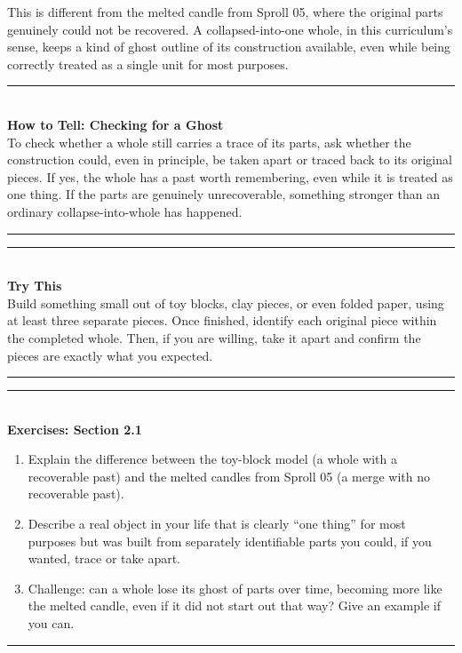 \documentclass[11pt]{book}
\newenvironment{algorithmproc}[1]{\vspace{0.6em}\noindent\rule{\linewidth}{0.6pt}\\[0.2em]\textbf{How to Tell: #1}\\[0.3em]}{\\[0.2em]\noindent\rule{\linewidth}{0.6pt}\vspace{0.6em}}
\newenvironment{exercisebox}[1]{\vspace{0.8em}\noindent\rule{\linewidth}{0.6pt}\\[0.2em]\textbf{Exercises: #1}\\[0.3em]\begin{enumerate}[label=\arabic*., itemsep=0.4em]}{\end{enumerate}\noindent\rule{\linewidth}{0.6pt}\vspace{0.6em}}
\newenvironment{trythis}{\vspace{0.6em}\noindent\rule{\linewidth}{0.6pt}\\[0.2em]\textbf{Try This}\\[0.3em]}{\\[0.2em]\noindent\rule{\linewidth}{0.6pt}\vspace{0.6em}}
\begin{document}
\begin{center}
\end{center}

This is different from the melted candle from Sproll 05, where the original parts genuinely could not be recovered. A collapsed-into-one whole, in this curriculum's sense, keeps a kind of ghost outline of its construction available, even while being correctly treated as a single unit for most purposes.

\begin{algorithmproc}{Checking for a Ghost}
To check whether a whole still carries a trace of its parts, ask whether the construction could, even in principle, be taken apart or traced back to its original pieces. If yes, the whole has a past worth remembering, even while it is treated as one thing. If the parts are genuinely unrecoverable, something stronger than an ordinary collapse-into-whole has happened.
\end{algorithmproc}

\begin{trythis}
Build something small out of toy blocks, clay pieces, or even folded paper, using at least three separate pieces. Once finished, identify each original piece within the completed whole. Then, if you are willing, take it apart and confirm the pieces are exactly what you expected.
\end{trythis}

\begin{exercisebox}{Section 2.1}
\item Explain the difference between the toy-block model (a whole with a recoverable past) and the melted candles from Sproll 05 (a merge with no recoverable past).
\item Describe a real object in your life that is clearly ``one thing'' for most purposes but was built from separately identifiable parts you could, if you wanted, trace or take apart.
\item Challenge: can a whole lose its ghost of parts over time, becoming more like the melted candle, even if it did not start out that way? Give an example if you can.
\end{exercisebox}
\end{document}
